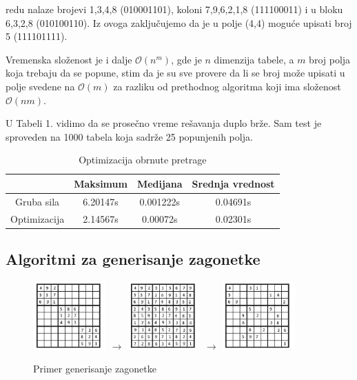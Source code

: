 \documentclass[a4paper]{article}
\begin{document}
    redu nalaze brojevi 1,3,4,8 (010001101), koloni 7,9,6,2,1,8 (111100011) i u bloku 6,3,2,8 (010100110). Iz ovoga zaključujemo da je u polje (4,4)
    moguće upisati broj 5 (111101111).
    \par Vremenska složenost je i dalje $\mathcal{O}(n^m)$, gde je $n$ dimenzija tabele, a $m$ broj polja koja trebaju da se popune, stim da je su sve provere da li se broj može upisati 
    u polje svedene na $\mathcal{O}(m)$ za razliku od prethodnog algoritma koji ima složenost $\mathcal{O}(nm)$. 
    \par U Tabeli 1. vidimo da se prosečno vreme rešavanja duplo brže. Sam test je sproveden na 1000 tabela koja sadrže 25 popunjenih polja.
    \begin{table}[h]
        \centering
        \begin{tabular}{ |c|c|c|c|}
            \hline
            & Maksimum & Medijana & Srednja vrednost \\
            \hline
            Gruba sila & 6.20147s & 0.001222s & 0.04691s \\
            \hline
            Optimizacija & 2.14567s & 0.00072s & 0.02301s \\
            \hline
        \end{tabular}
        \caption{Optimizacija obrnute pretrage}
    \end{table}

    \subsection{Algoritmi za generisanje zagonetke}
    \begin{figure}[H]
        \centering
        \includegraphics[width=0.25\textwidth, height=0.25\textwidth]{img/diag-fill.jpg}
        $\longrightarrow$
        \includegraphics[width=0.25\textwidth, height=0.25\textwidth]{img/full.jpg}
        $\longrightarrow$
        \includegraphics[width=0.25\textwidth, height=0.25\textwidth]{img/generated.jpg}
        \caption{Primer generisanje zagonetke}
    \end{figure}
\end{document}
